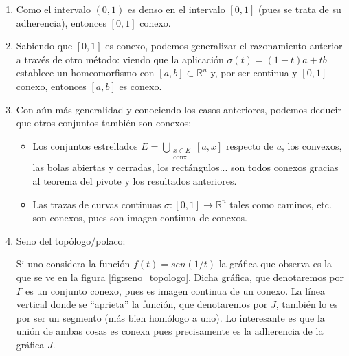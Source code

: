 \begin{ej}
\begin{enumerate}

    \item Como el intervalo $\left( 0, 1 \right)$ es denso en el intervalo $\left[ 0, 1 \right]$ (pues se trata de su adherencia), entonces $\left[ 0, 1 \right]$ conexo.
    
    \item Sabiendo que $[0,1]$ es conexo, podemos generalizar el razonamiento anterior a través de otro método: viendo que la aplicación $\sigma\left( t \right) = \left( 1 - t \right) a + tb$ establece un homeomorfismo con $\left[ a, b \right] \subset \mathbb{R}^n$ y, por ser continua y $[0,1]$ conexo, entonces $\left[ a, b \right]$ es conexo.
    
    \item Con aún más generalidad y conociendo los casos anteriores, podemos deducir que otros conjuntos también son conexos:
    \begin{itemize}
        \item Los conjuntos estrellados $E = \bigcup_{\substack{x \in E\\ \text{conx.}}} \left[ a, x \right]$ respecto de $a$, los convexos, las bolas abiertas y cerradas, los rectángulos... son todos conexos gracias al teorema del pivote y los resultados anteriores.
        
        \item Las trazas de curvas continuas $\sigma: \left[ 0, 1 \right] \rightarrow \mathbb{R}^n$ tales como caminos, etc. son conexos, pues son imagen continua de conexos.
    \end{itemize}
    
    \item Seno del topólogo/polaco:
    
    Si uno considera la función $f(t) = sen(1/t)$ la gráfica que observa es la que se ve en la figura \ref{fig:seno_topologo}. Dicha gráfica, que denotaremos por $\Gamma$ es un conjunto conexo, pues es imagen continua de un conexo. La línea vertical donde se ``aprieta'' la función, que denotaremos por $J$, también lo es por ser un segmento (más bien homólogo a uno). Lo interesante es que la unión de ambas cosas es conexa pues precisamente es la adherencia de la gráfica $J$.


\end{enumerate}
\end{ej}
